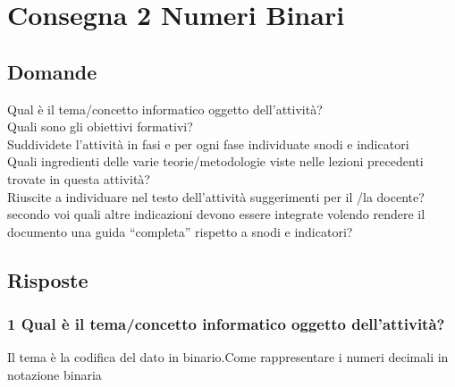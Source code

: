 \documentclass[a4paper]{article}
\begin{document}
\section{Consegna 2 \large Numeri Binari}
\subsection{Domande}
Qual è il tema/concetto informatico oggetto dell’attività?\\

Quali sono gli obiettivi formativi?\\

Suddividete l’attività in fasi e per ogni fase individuate snodi  e indicatori\\

Quali ingredienti delle varie teorie/metodologie viste nelle lezioni precedenti trovate in questa attività?\\

Riuscite a individuare nel testo dell’attività suggerimenti per il /la docente? secondo voi quali altre indicazioni devono essere integrate volendo rendere il documento una guida “completa” rispetto a snodi e indicatori?\\

\subsection{Risposte}
\subsubsection{1 Qual è il tema/concetto informatico oggetto dell’attività?} 
Il tema è la codifica del dato in binario.Come rappresentare i numeri decimali in notazione binaria
\end{document}

